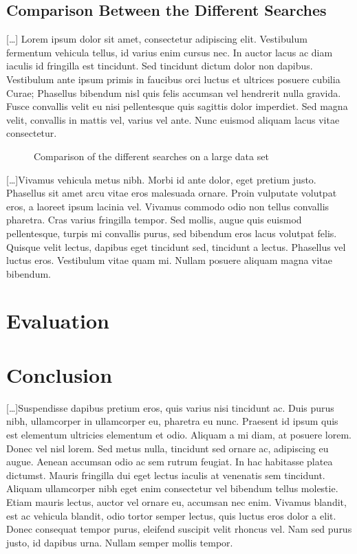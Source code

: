 \documentclass[letterpaper]{article}
\begin{document}
  \subsection{Comparison Between the Different Searches}
    [\ldots] Lorem ipsum dolor sit amet, consectetur adipiscing elit. Vestibulum fermentum vehicula tellus, id varius enim cursus nec. In auctor lacus ac diam iaculis id fringilla est tincidunt. Sed tincidunt dictum dolor non dapibus. Vestibulum ante ipsum primis in faucibus orci luctus et ultrices posuere cubilia Curae; Phasellus bibendum nisl quis felis accumsan vel hendrerit nulla gravida. Fusce convallis velit eu nisi pellentesque quis sagittis dolor imperdiet. Sed magna velit, convallis in mattis vel, varius vel ante. Nunc euismod aliquam lacus vitae consectetur. 
    
    \begin{figure}[H]
  	  \centering
  	  \setlength\fboxsep{0pt}
	  \setlength\fboxrule{0.5pt}
      \caption{Comparison of the different searches on a large data set}
	\end{figure}
	
	[\ldots]Vivamus vehicula metus nibh. Morbi id ante dolor, eget pretium justo. Phasellus sit amet arcu vitae eros malesuada ornare. Proin vulputate volutpat eros, a laoreet ipsum lacinia vel. Vivamus commodo odio non tellus convallis pharetra. Cras varius fringilla tempor. Sed mollis, augue quis euismod pellentesque, turpis mi convallis purus, sed bibendum eros lacus volutpat felis. Quisque velit lectus, dapibus eget tincidunt sed, tincidunt a lectus. Phasellus vel luctus eros. Vestibulum vitae quam mi. Nullam posuere aliquam magna vitae bibendum.
  
\section{Evaluation}
  
\section{Conclusion}
  [\ldots]Suspendisse dapibus pretium eros, quis varius nisi tincidunt ac. Duis purus nibh, ullamcorper in ullamcorper eu, pharetra eu nunc. Praesent id ipsum quis est elementum ultricies elementum et odio. Aliquam a mi diam, at posuere lorem. Donec vel nisl lorem. Sed metus nulla, tincidunt sed ornare ac, adipiscing eu augue. Aenean accumsan odio ac sem rutrum feugiat. In hac habitasse platea dictumst. Mauris fringilla dui eget lectus iaculis at venenatis sem tincidunt. Aliquam ullamcorper nibh eget enim consectetur vel bibendum tellus molestie. Etiam mauris lectus, auctor vel ornare eu, accumsan nec enim. Vivamus blandit, est ac vehicula blandit, odio tortor semper lectus, quis luctus eros dolor a elit. Donec consequat tempor purus, eleifend suscipit velit rhoncus vel. Nam sed purus justo, id dapibus urna. Nullam semper mollis tempor.
  
\nocite{*}


\end{document}
